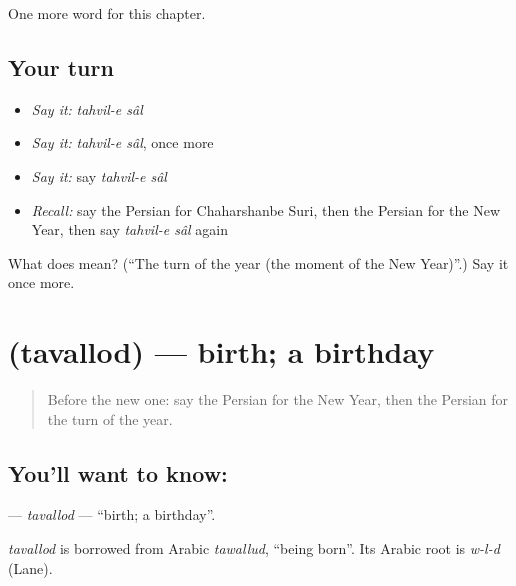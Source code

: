 \begin{grammarlens}[title={What you've built}]
One more word for this chapter.
\end{grammarlens}

\subsection*{Your turn}
\begin{itemize}
\raggedright
  \item \emph{Say it:} \emph{tahvil-e sâl}
  \item \emph{Say it:} \emph{tahvil-e sâl}, once more
  \item \emph{Say it:} say \emph{tahvil-e sâl}
  \item \emph{Recall:} say the Persian for Chaharshanbe Suri, then the Persian for the New Year, then say \emph{tahvil-e sâl} again
\end{itemize}

\begin{tcolorbox}[breakable,colback=teal!4,colframe=teal!35!black,title={Before you move on}]
What does   mean? (\textquotedblleft{}The turn of the year (the moment of the New Year)\textquotedblright{}.) Say it once more.
\end{tcolorbox}
\section[\texorpdfstring{\fa{تولد} (tavallod)}{تولد (tavallod)}]{ (tavallod) — birth; a birthday}

\label{lesson:FA-C228-tavallod}



\begin{quote}
Before the new one: say the Persian for the New Year, then the Persian for the turn of the year.
\end{quote}

\subsection*{You'll want to know: }
\textbf{} — \emph{tavallod} — \textquotedblleft{}birth; a birthday\textquotedblright{}.

\begin{cousinweb}
\emph{tavallod} is borrowed from Arabic \emph{tawallud}, \textquotedblleft{}being born\textquotedblright{}. Its Arabic root is \emph{w-l-d} (Lane).
\end{cousinweb}

